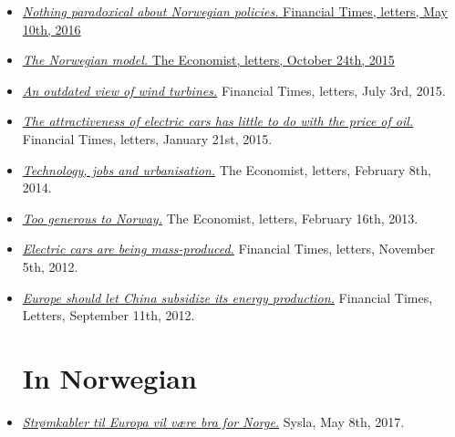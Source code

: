 \documentclass[margin]{res}
\begin{document}
\begin{resume}
\begin{itemize}
\item[] \href{https://next.ft.com/content/a9ca4ad4-15d8-11e6-9d98-00386a18e39d}{\emph{Nothing paradoxical about Norwegian policies.} Financial Times, letters, May 10th, 2016}

\item[] \href{http://www.economist.com/news/letters/21676738-letters}{\emph{The Norwegian model.} The Economist, letters, October 24th, 2015}

\item[] \href{http://www.ft.com/intl/cms/s/0/e22cba5c-1bfa-11e5-a130-2e7db721f996.html#axzz3giRBkRau}{\emph{An outdated view of wind turbines.}} Financial Times, letters, July 3rd, 2015.

\item[] \href{http://www.ft.com/intl/cms/s/0/313360bc-a00c-11e4-aa89-00144feab7de.html#axzz3PVKMfhY5}{\emph{The attractiveness of electric cars has little to do with the price of oil.}} Financial Times, letters, January 21st, 2015.

\item[] \href{http://www.economist.com/news/letters/21595871-livestock-and-emissions-california-technology-and-jobs-algorithms}{\emph{Technology, jobs and urbanisation.}}   The Economist, letters, February 8th, 2014.

\item[] \href{http://www.economist.com/news/letters/21571848-nordic-countries-private-schools-immigration-sandhurst-ed-koch-richard-iii}{\emph{Too generous to Norway.}} The Economist, letters, February 16th, 2013.

\item[] \href{http://www.ft.com/intl/cms/s/0/26168da6-238d-11e2-bb86-00144feabdc0.html#axzz2sclP2DP5}{\emph{Electric cars are being mass-produced.}}  Financial Times, letters, November 5th, 2012.

\item[] \href{http://www.ft.com/intl/cms/s/0/553d8cf6-fb56-11e1-87ae-00144feabdc0.html#axzz2sclP2DP5}{\emph{Europe should let China subsidize its energy production.}}  Financial Times, Letters, September 11th, 2012.


\normalsize{\section{In Norwegian}}

\item[]  \href{http://sysla.no/meninger/stromkabler-til-europa-vil-vaere-bra-norge/}{\emph{Str\o mkabler til Europa vil være bra for Norge.}} Sysla, May 8th, 2017.


\end{itemize}
\end{resume}
\end{document}
